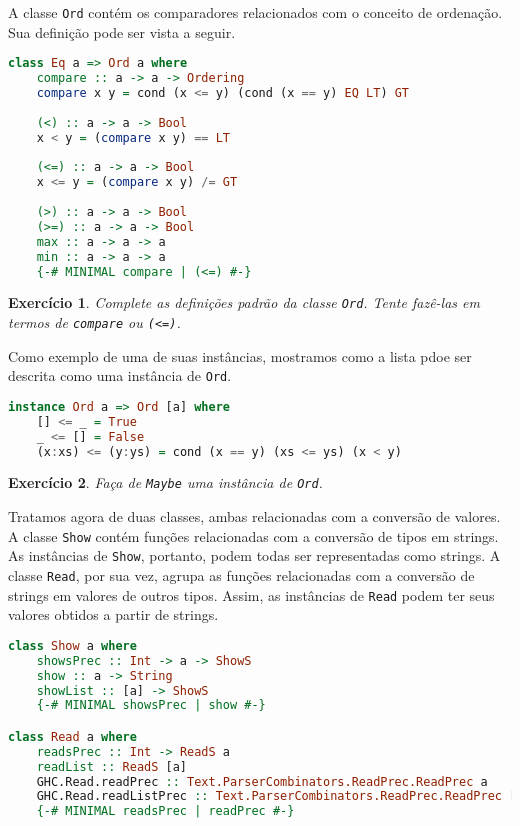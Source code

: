 \documentclass[a4paper]{article}
\newtheorem{exercicio}{Exercício}
\begin{document}
A classe \texttt{Ord} contém os comparadores relacionados com o conceito de ordenação.
Sua definição pode ser vista a seguir.

\begin{lstlisting}[language=haskell, frame=single]
class Eq a => Ord a where
	compare :: a -> a -> Ordering
	compare x y = cond (x <= y) (cond (x == y) EQ LT) GT
	
	(<) :: a -> a -> Bool
	x < y = (compare x y) == LT
	
	(<=) :: a -> a -> Bool
	x <= y = (compare x y) /= GT
	
	(>) :: a -> a -> Bool
	(>=) :: a -> a -> Bool
	max :: a -> a -> a
	min :: a -> a -> a
	{-# MINIMAL compare | (<=) #-}
\end{lstlisting}

\begin{exercicio}
	Complete as definições padrão da classe \emph{\texttt{Ord}}.
	Tente fazê-las em termos de \emph{\texttt{compare}} ou \emph{\texttt{(<=)}}.
\end{exercicio}

Como exemplo de uma de suas instâncias, mostramos como a lista pdoe ser descrita como uma instância de \texttt{Ord}.

\begin{lstlisting}[language=haskell, frame=single]
instance Ord a => Ord [a] where
	[] <= _ = True
	_ <= [] = False
	(x:xs) <= (y:ys) = cond (x == y) (xs <= ys) (x < y)
\end{lstlisting}

\begin{exercicio}
	Faça de \emph{\texttt{Maybe}} uma instância de \emph{\texttt{Ord}}.
\end{exercicio}

Tratamos agora de duas classes, ambas relacionadas com a conversão de valores.
A classe \texttt{Show} contém funções relacionadas com a conversão de tipos em strings.
As instâncias de \texttt{Show}, portanto, podem todas ser representadas como strings.
A classe \texttt{Read}, por sua vez, agrupa as funções relacionadas com a conversão de strings em valores de outros tipos.
Assim, as instâncias de \texttt{Read} podem ter seus valores obtidos a partir de strings.

\begin{lstlisting}[language=haskell, frame=single]
class Show a where
	showsPrec :: Int -> a -> ShowS
	show :: a -> String
	showList :: [a] -> ShowS
	{-# MINIMAL showsPrec | show #-}

class Read a where
	readsPrec :: Int -> ReadS a
	readList :: ReadS [a]
	GHC.Read.readPrec :: Text.ParserCombinators.ReadPrec.ReadPrec a
	GHC.Read.readListPrec :: Text.ParserCombinators.ReadPrec.ReadPrec [a]
	{-# MINIMAL readsPrec | readPrec #-}
\end{lstlisting}
\end{document}
